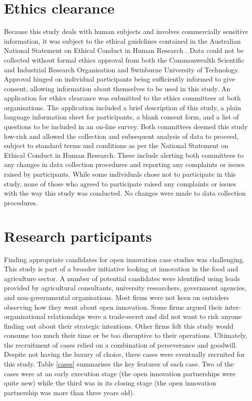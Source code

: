 \section{Ethics clearance}

Because this study deals with human subjects and involves commercially sensitive information, it was subject to the ethical guidelines contained in the Australian National Statement on Ethical Conduct in Human Research \citep{national2007national}. Data could not be collected without formal ethics approval from both the Commonwealth Scientific and Industrial Research Organisation and Swinburne University of Technology. Approval hinged on individual participants being sufficiently informed to give consent, allowing information about themselves to be used in this study. An application for ethics clearance was submitted to the ethics committees at both organisations. The application included a brief description of this study, a plain language information sheet for participants, a blank consent form, and a list of questions to be included in an on-line survey. Both committees deemed this study low\hyp{}risk and allowed the collection and subsequent analysis of data to proceed, subject to standard terms and conditions as per the National Statement on Ethical Conduct in Human Research. These include alerting both committees to any changes in data collection procedures and reporting any complaints or issues raised by participants. While some individuals chose not to participate in this study, none of those who agreed to participate raised any complaints or issues with the way this study was conducted. No changes were made to data collection procedures. \medskip

\section{Research participants}

Finding appropriate candidates for open innovation case studies was challenging. This study is part of a broader initiative looking at innovation in the food and agriculture sector. A number of potential candidates were identified using leads provided by agricultural consultants, university researchers, government agencies, and non\hyp{}governmental organisations. Most firms were not keen on outsiders observing how they went about open innovation. Some firms argued their inter\hyp{}organisational relationships were a trade-secret and did not want to risk anyone finding out about their strategic intentions. Other firms felt this study would consume too much their time or be too disruptive to their operations. Ultimately, the recruitment of cases relied on a combination of perseverance and goodwill. Despite not having the luxury of choice, three cases were eventually recruited for this study. Table \ref{cases} summarises the key features of each case. Two of the cases were at an early execution stage (the open innovation partnerships were quite new) while the third was in its closing stage (the open innovation partnership was more than three years old).  \medskip

